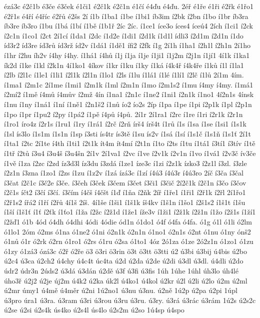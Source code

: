 {ézá3c
é2č1b
é3če
é3ček
é1či1
é2č1k
é2č1n
é1čí
é4ďu
é4ďu.
2éř
é1ře
é1ři
é2řk
é1řo1
é2ř1s
é4ří
é4říc
é2řů
é2šs
2í
í1b
í1ba1
í1be
í1bi1
íb3im
í2bk
í2bn
í1bo
í1br
íb3ra
íb3re
íb3ro
í1bu
í1bá
í1bí
í1bě
í1b1ř
2íc
2íc.
í1ce1
íce3o
íces4
íceú4
2ích
í1ci1
í2ck
í2c1n
í1co1
í2ct
2í1cí
í1da1
í2dc
í1d2e
í1di1
í2d1k
í1d1l
ídli3
í2d1m
í2d1n
í1do
íd3r2
íd3re
íd3rů
íd3rž
íd2v
í1dá1
í1dě1
ífi2
í2fk
í1g
2í1h
í1ha1
í2h1l
í2h1n
2í1ho
í1hr
í2hu
íh2v
í4hy
í4hy.
í1há1
í4hů
í1j
í1ja
í1je
í1ji1
í1j2m
í2j1n
í1jí1
4í1k
í1ka1
ík2d
í1ke
í1kl
í2k1n
4í1ko1
4íkov
í1kr
í1ku
í1ky
í1ká
í4k4ř
í4k4ře
í1ků
í1l
í1la1
í2lb
í2l1c
í1le1
í1li1
í2l1k
í2l1n
í1lo1
í2ls
í1lu
í1lá1
í1lé
í1lí1
í2lč
í1lů
2í1m
4ím.
í1ma1
í2m1c
2í1me
í1mi1
í2m1k
í1ml
í2m1n
í1mo
í2m1s2
í1mu
í4my
í4my.
í1má1
í2mí2
í1mě
í4mů
í4mův
í2mž
4ín
í1na1
í2n1c
í1ne2
í1ni1
í2n1k
í1no1
4í2n1s
4ínsk
í1nu
í1ny
í1ná1
í1ní
í1ně1
í2n1š2
í1nů
ío2
ío2s
2íp
í1pa
í1pe
í1pi
í2p1k
í1pl
í2p1n
í1po
í1pr
í1pu2
í2py
í1pá2
í1pě
í4pů
í4pů.
2í1r
2í1ra1
í2rc
í1re
í1ri
í2r1k
í2r1n
í1ro1
íro4z
í2r1s
í1ru1
í1ry
í1rá1
í2rč
í2rň
írš4
írš4t
í1rů
í1s
í1sa
í1se
í1si1
í1s1k
í1sl
ís3lo
í1s1m
í1s1n
í1sp
í3sti
ís4tr
ís3tě
í1su
ís2v
í1sá
í1sí
í1s1č
í1s1ň
í1s1ť
2í1t
í1ta1
í2tc
2í1te
í4th
í1ti1
í2t1k
ít4m
ít4mí
í2t1n
í1to
í2ts
í1tu
í1tá1
í3tí1
í3tív
í1tě
í1tř
í2tů
í3u4
í3u4š
í3u4šn
2í1v
2í1va1
í2vc
í1ve
í2v1k
í2v1n
í1vo
í1vá1
í2v3č
ív3če
í1vě
í1za
í2zc
í2zd
íz3d3l
íz3du
í3zdá
í1ze1
íze3c
í1zi
í2z1k
ízko3
í2z1l
í3zl.
í3zle
í2z1n
í3zna
í1zo1
í2zs
í1zu
í1z2v
í1zá
ízá3c
í1zí
í4ú3
í4ú3r
í4ú3ro
2íč
í3ča
í3čal
í3čat
í2č1c
í3č2e
í3če.
í3čeh
í3ček
í3čem
í3čet
í3či1
í3čič
2í2č1k
í2č1n
í3čo
í3čov
í2č1s
íčt2
í3čí
í3čí.
í3čím
í4čš
í4čšt
í1ď
í1ňa
í2ňk
2íř
í1ře1
í1ři1
í2ř1k
í2řl
2í1řo1
í2ř1s2
ířá2
í1ří
í2řů
4í1š
2íš.
4í1še
í1ši1
í1š1k
íš4kv
í1š1n
í1šo1
í2š1s2
í1š1t
í1šu
í1ší
í1š1ť
í1ť
í2ťk
í1ťo1
í1ža
í2žc
í2ž1d
í1že1
íže3v
í1ži1
í2ž1k
í2ž1n
í1žo
í2ž1s
í1ží1
í2žď1
ó1b
4ód
ó4dh
ó4dhi
4ódi
4ódie
ód1n
ó1do1
ó4f
ó4fa
ó4fa.
ó1g
ó1l
ó1li
ó2lm
ó1lo1
2óm
ó2ms
ó1na
ó1ne2
ó1ni
ó2n1k
ó2n1n
ó1no1
ó2n1s
ó2nt
ó1nu
ó1ny
ónš2
ó1nů
ó1r
ó2rk
ó2rn
ó1ro1
ó2rs
ó1ru
ó2sa
ó1to1
4óz
2ó1za
ó1ze
2ó2z1n
ó1zo1
ó1zu
ó1zy
ó1zá3
ózá3c
ó2ř
ó2ře
ö3
ö3ri
ö3rin
ö3t
ö3tt
ö3tti
ú2
ú3bi
ú3bij
ú4bis
ú2bo
ú2c4
ú3ca
ú2ch2
ú4chy
ú4c4t
úc4ta
ú2d
ú2da
ú2de
ú2di
ú3dl
ú3dl.
ú4dli
ú2do
údr2
údr3n
2úds2
ú3dá
ú3dán
ú2dě
ú3f
ú3fi
ú3fis
1úh
1úhe
1úhl
úh3lo
úh4lé
úho3ř
ú2j2
ú2je
új2m
ú4k2
ú2ka
úk2l
ú4ko1
ú4kol
ú2kr
ú2l
ú2li
ú2lo
ú2m
ú2ml
ú2mr
úmy1
ú4mě
ú4měr
ú2ni
1ú2no1
ú3nu
ú3nu.
ú2ně
1ú2p
ú2pa
ú2pi
1úpl
ú3pro
úra1
ú3ra.
ú3ram
ú3ri
ú3rou
ú3ru
ú3ru.
ú3ry.
ú3rá
ú3rác
ú3rám
1ú2s
ú2s2c
ú2se
ú2si
ú2s4k
ús4ko
ú2s4l
ús4lo
ú2s2m
ú2so
1ú4sp
ú4spo
}
